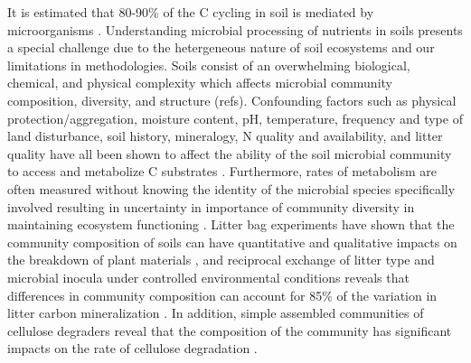 It is estimated that 80-90\% of the C cycling in soil is mediated by microorganisms \cite{ColemanCrossley_1996,Nannipieri_2003}. Understanding microbial processing of nutrients in soils presents a special challenge due to the hetergeneous nature of soil ecosystems and our limitations in methodologies. Soils consist of an overwhelming biological, chemical, and physical complexity which affects microbial community composition, diversity, and structure (refs). Confounding factors such as physical protection/aggregation, moisture content, pH, temperature, frequency and type of land disturbance, soil history, mineralogy, N quality and availability, and litter quality have all been shown to affect the ability of the soil microbial community to access and metabolize C substrates \cite{Schlesinger_1977,dgett_Wall_Hattenschwiler_2010,Sollins_Homann_Caldwell_1996,Torn_Vitousek_Trumbore_2005,TRUMBORE_2006,Schimel_2012}. Furthermore, rates of metabolism are often measured without knowing the identity of the microbial species specifically involved \cite{ndi_Pietramellara_Renella_2003} resulting in uncertainty in importance of community diversity in maintaining ecosystem functioning \cite{Allison_2008,ndi_Pietramellara_Renella_2003,Schimel_2012}. Litter bag experiments have shown that the community composition of soils can have quantitative and qualitative impacts on the breakdown of plant materials \cite{Schimel_1995}, and reciprocal exchange of litter type and microbial inocula under controlled environmental conditions reveals that differences in community composition can account for 85\% of the variation in litter carbon mineralization \cite{Strickland_2009}. In addition, simple assembled communities of cellulose degraders reveal that the composition of the community has significant impacts on the rate of cellulose degradation \cite{Wohl_2004}. 

